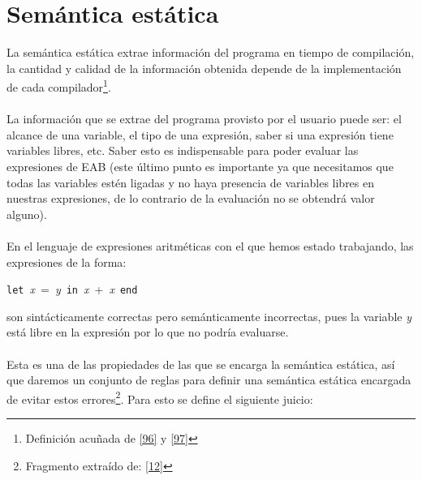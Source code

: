     \section{Semántica estática}
    La semántica estática extrae información del programa en tiempo de compilación, la cantidad y calidad de la información obtenida depende de la implementación de cada compilador\footnote{Definición acuñada de \hyperlink{96}{[96]} y \hyperlink{97}{[97]}}. \\\\
    La información que se extrae del programa provisto por el usuario puede ser: el alcance de una variable, el tipo de una expresión, saber si una expresión tiene variables libres, etc. Saber esto es indispensable  para poder evaluar las expresiones de \textsf{EAB} (este último punto es importante ya que necesitamos que todas las variables estén ligadas y no haya presencia de variables libres en nuestras expresiones, de lo contrario de la evaluación no se obtendrá valor alguno).\\\\
    En el lenguaje de expresiones aritméticas con el que hemos estado trabajando, las expresiones de la forma:
        \begin{center}
                \texttt{let}\ \textit{x}\ =\ \textit{y}\ \texttt{in}\ \textit{x}\ +\ \textit{x}\ \texttt{end}
        \end{center}
    son sintácticamente correctas pero semánticamente incorrectas, pues la variable \textit{y} está libre en la expresión por lo que no podría evaluarse.\\\\
    Esta es una de las propiedades de las que se encarga la semántica estática, así que daremos un conjunto de reglas para definir una semántica estática encargada de evitar estos errores\footnote{Fragmento extraído de: \hyperlink{12}{[12]} }. Para esto se define el siguiente juicio: 

